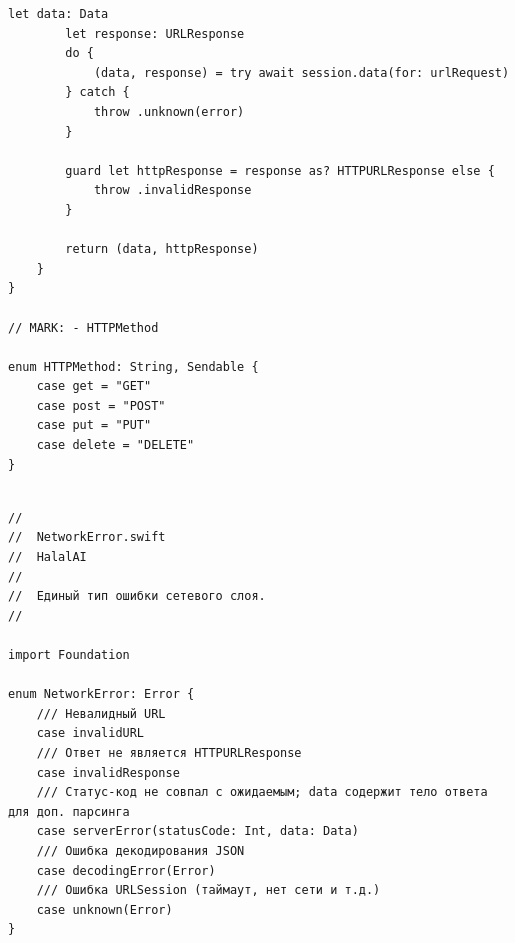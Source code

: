 \begin{lstlisting}[basicstyle=\tiny\ttfamily,breaklines=true]
        let data: Data
        let response: URLResponse
        do {
            (data, response) = try await session.data(for: urlRequest)
        } catch {
            throw .unknown(error)
        }

        guard let httpResponse = response as? HTTPURLResponse else {
            throw .invalidResponse
        }

        return (data, httpResponse)
    }
}

// MARK: - HTTPMethod

enum HTTPMethod: String, Sendable {
    case get = "GET"
    case post = "POST"
    case put = "PUT"
    case delete = "DELETE"
}
\end{lstlisting}

\begin{lstlisting}[basicstyle=\tiny\ttfamily,breaklines=true]

//
//  NetworkError.swift
//  HalalAI
//
//  Единый тип ошибки сетевого слоя.
//

import Foundation

enum NetworkError: Error {
    /// Невалидный URL
    case invalidURL
    /// Ответ не является HTTPURLResponse
    case invalidResponse
    /// Статус-код не совпал с ожидаемым; data содержит тело ответа для доп. парсинга
    case serverError(statusCode: Int, data: Data)
    /// Ошибка декодирования JSON
    case decodingError(Error)
    /// Ошибка URLSession (таймаут, нет сети и т.д.)
    case unknown(Error)
}
\end{lstlisting}

